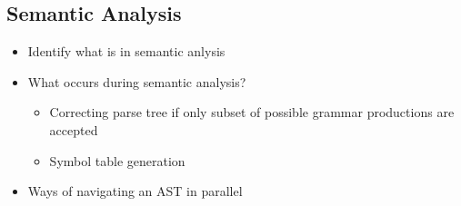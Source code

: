 \subsection{Semantic Analysis}
\begin{sectionplan}
    \begin{itemize}
        \item Identify what is in semantic anlysis
        \item What occurs during semantic analysis?
        \begin{itemize}
            \item Correcting parse tree if only subset of possible grammar productions are accepted
            \item Symbol table generation
        \end{itemize}
        \item Ways of navigating an AST in parallel
    \end{itemize}
\end{sectionplan}
